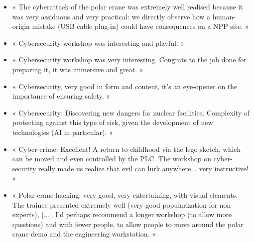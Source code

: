 \begin{itemize}
    \item « The cyberattack of the polar crane was extremely well realised because it was very assiduous and very practical: we directly observe how a human-origin mistake (USB cable plug-in) could have consequences on a NPP site. »
    \item « Cybersecurity workshop was interesting and playful. »
    \item « Cybersecurity workshop was very interesting. Congrats to the job done for preparing it, it was immersive and great. »
    \item « Cybersecurity, very good in form and content, it's an eye-opener on the importance of ensuring safety. »
    \item « Cybersecurity: Discovering new dangers for nuclear facilities. Complexity of protecting against this type of risk, given the development of new technologies (AI in particular). »
    \item « Cyber-crime: Excellent! A return to childhood via the lego sketch, which can be moved and even controlled by the PLC. The workshop on cyber-security really made us realize that evil can lurk anywhere... very instructive! »
    \item « Polar crane hacking: very good, very entertaining, with visual elements. The trainee presented extremely well (very good popularization for non-experts), [...]. I'd perhaps recommend a longer workshop (to allow more questions) and with fewer people, to allow people to move around the polar crane demo and the engineering workstation. »
\end{itemize}


%
%
